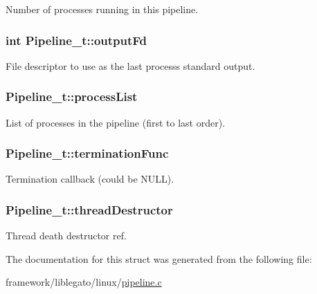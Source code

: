 Number of processes running in this pipeline. 

\subsubsection[{\texorpdfstring{output\+Fd}{outputFd}}]{\setlength{\rightskip}{0pt plus 5cm}int Pipeline\+\_\+t\+::output\+Fd}\hypertarget{struct_pipeline__t_a769458a0d2dcad58d0f9e6910c6743f8}{}\label{struct_pipeline__t_a769458a0d2dcad58d0f9e6910c6743f8}


File descriptor to use as the last process\textquotesingle{}s standard output. 

\subsubsection[{\texorpdfstring{process\+List}{processList}}]{ Pipeline\+\_\+t\+::process\+List}\hypertarget{struct_pipeline__t_a9eeb31f6a75389c90b3c06a77e4710c6}{}\label{struct_pipeline__t_a9eeb31f6a75389c90b3c06a77e4710c6}


List of processes in the pipeline (first to last order). 

\subsubsection[{\texorpdfstring{termination\+Func}{terminationFunc}}]{ Pipeline\+\_\+t\+::termination\+Func}\hypertarget{struct_pipeline__t_adb79284216c6f46b525940cb03acd152}{}\label{struct_pipeline__t_adb79284216c6f46b525940cb03acd152}


Termination callback (could be N\+U\+LL). 

\subsubsection[{\texorpdfstring{thread\+Destructor}{threadDestructor}}]{ Pipeline\+\_\+t\+::thread\+Destructor}\hypertarget{struct_pipeline__t_ad3dc80b5169a7dead64a6346abc65436}{}\label{struct_pipeline__t_ad3dc80b5169a7dead64a6346abc65436}


Thread death destructor ref. 



The documentation for this struct was generated from the following file\+:\begin{DoxyCompactItemize}
\item 
framework/liblegato/linux/\hyperlink{pipeline_8c}{pipeline.\+c}\end{DoxyCompactItemize}
